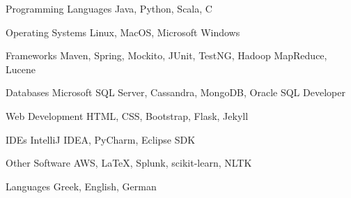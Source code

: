 

\begin{cvskills}

  \cvskill
    {Programming Languages} %
    {Java, Python, Scala, C} %

  \cvskill
    {Operating Systems} %
    {Linux, MacOS, Microsoft Windows} %
    
  \cvskill
    {Frameworks} %
    {Maven, Spring, Mockito, JUnit, TestNG, Hadoop MapReduce, Lucene} %

  \cvskill
    {Databases} %
    {Microsoft SQL Server, Cassandra, MongoDB, Oracle SQL Developer} %

  \cvskill
    {Web Development} %
    {HTML, CSS, Bootstrap, Flask, Jekyll} %

  \cvskill
    {IDEs} %
    {IntelliJ IDEA, PyCharm, Eclipse SDK} %

  \cvskill
    {Other Software} %
    {AWS, LaTeX, Splunk, scikit-learn, NLTK} %

  \cvskill
    {Languages} %
    {Greek, English, German} %

\end{cvskills}
